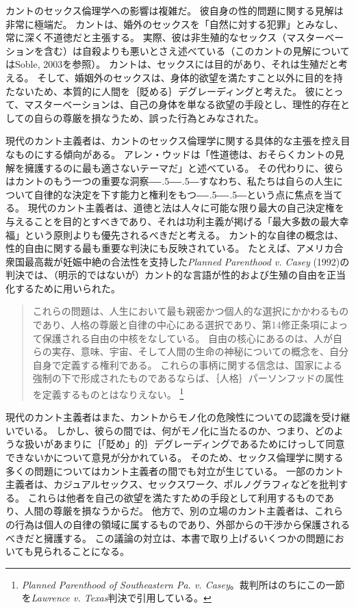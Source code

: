 \documentclass[paper=a4,book,openany]{jlreq}
\def\DDASH{―\kern-.5\zw―\kern-.5\zw―} %
\begin{document}
カントのセックス倫理学への影響は複雑だ\citep[]{herman02:_could_it_be_worth_think}。
彼自身の性的問題に関する見解は非常に極端だ。
カントは、婚外のセックスを「自然に対する犯罪」とみなし、常に深く不道徳だと主張する。
実際、彼は非生殖的なセックス（マスターベーションを含む）は自殺よりも悪いとさえ述べている（このカントの見解についてはSoble, 2003\nocite{soble03:_kant_sexual_perver}を参照）。
カントは、セックスには目的があり、それは生殖だと考える。
そして、婚姻外のセックスは、身体的欲望を満たすこと以外に目的を持たないため、本質的に人間を｛貶める｝{デグレーディング}と考えた。
彼にとって、マスターベーションは、自己の身体を単なる欲望の手段とし、理性的存在としての自らの尊厳を損なうため、誤った行為とみなされた。

現代のカント主義者は、カントのセックス倫理学に関する具体的な主張を控え目なものにする傾向がある。
アレン・ウッドは「性道徳は、おそらくカントの見解を擁護するのに最も適さないテーマだ」と述べている\citep[p.224]{wood08:_kantian_ethic}。
その代わりに、彼らはカントのもう一つの重要な洞察{\DDASH}すなわち、私たちは自らの人生について自律的な決定を下す能力と権利をもつ{\DDASH}という点に焦点を当てる。
現代のカント主義者は、道徳と法は人々に可能な限り最大の自己決定権を与えることを目的とすべきであり、それは功利主義が掲げる「最大多数の最大幸福」という原則よりも優先されるべきだと考える。
カント的な自律の概念は、性的自由に関する最も重要な判決にも反映されている。
たとえば、アメリカ合衆国最高裁が妊娠中絶の合法性を支持した\emph{Planned Parenthood v. Casey} (1992)の判決では、（明示的ではないが）カント的な言語が性的および生殖の自由を正当化するために用いられた。

\begin{quote}
これらの問題は、人生において最も親密かつ個人的な選択にかかわるものであり、人格の尊厳と自律の中心にある選択であり、第14修正条項によって保護される自由の中核をなしている。
自由の核心にあるのは、人が自らの実存、意味、宇宙、そして人間の生命の神秘についての概念を、自分自身で定義する権利である。
これらの事柄に関する信念は、国家による強制の下で形成されたものであるならば、｛人格｝{パーソンフッド}の属性を定義するものとはなりえない。
\footnote{\emph{Planned Parenthood of Southeastern Pa. v. Casey}。裁判所はのちにこの一節を\emph{Lawrence v. Texas}判決で引用している。}
\end{quote}

現代のカント主義者はまた、カントからモノ化の危険性についての認識を受け継いでいる。
しかし、彼らの間では、何がモノ化に当たるのか、つまり、どのような扱いがあまりに｛「貶め」的｝{デグレーディング}であるためにけっして同意できないかについて意見が分かれている。
そのため、セックス倫理学に関する多くの問題についてはカント主義者の間でも対立が生じている。
一部のカント主義者は、カジュアルセックス、セックスワーク、ポルノグラフィなどを批判する。
これらは他者を自己の欲望を満たすための手段として利用するものであり、人間の尊厳を損なうからだ。
他方で、別の立場のカント主義者は、これらの行為は個人の自律の領域に属するものであり、外部からの干渉から保護されるべきだと擁護する。
この議論の対立は、本書で取り上げるいくつかの問題においても見られることになる。
\end{document}
